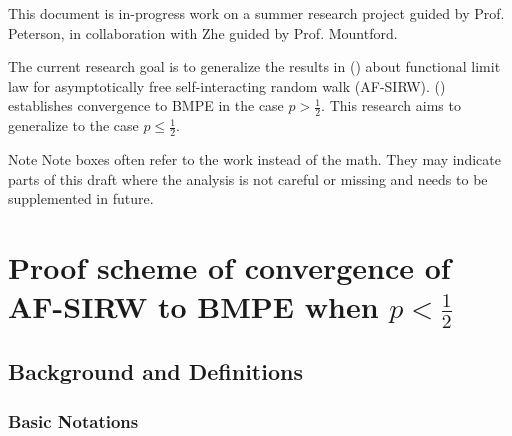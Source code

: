 


This document is in-progress work on a summer research project guided by Prof. Peterson, in collaboration with Zhe guided by Prof. Mountford.

The current research goal is to generalize the results in (\cite{kosyginaConvergenceNonconvergenceScaled2022}) about functional limit law for asymptotically free self-interacting random walk (AF-SIRW). (\cite{kosyginaConvergenceNonconvergenceScaled2022}) establishes convergence to BMPE in the case $p > \frac{1}{2}$. This research aims to generalize to the case  $p \le \frac{1}{2}$.

\begin{note}{Note}
	Note boxes often refer to the work instead of the math. They may indicate parts of this draft where the analysis is not careful or missing and needs to be supplemented in future.
\end{note}

\section{Proof scheme of convergence of AF-SIRW to BMPE when $p < \frac{1}{2}$}

\subsection{Background and Definitions}

\subsubsection{Basic Notations}

